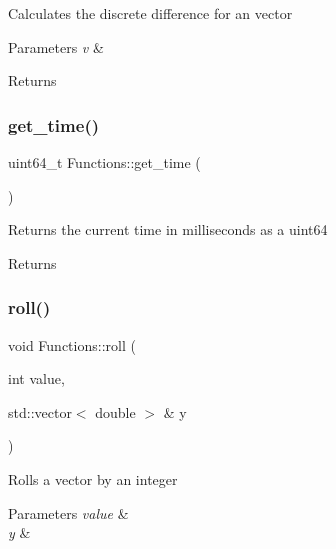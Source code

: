Calculates the discrete difference for an vector


\begin{DoxyParams}{Parameters}
{\em v} & \\
\hline
\end{DoxyParams}
\begin{DoxyReturn}{Returns}

\end{DoxyReturn}
\mbox{\label{namespace_functions_a0f3325eb8b88e73ff76e558290d3b346}} 
\subsubsection{\texorpdfstring{get\+\_\+time()}{get\_time()}}
{\footnotesize\ttfamily uint64\+\_\+t Functions\+::get\+\_\+time (\begin{DoxyParamCaption}{ }\end{DoxyParamCaption})}

Returns the current time in milliseconds as a uint64 \begin{DoxyReturn}{Returns}

\end{DoxyReturn}
\mbox{\label{namespace_functions_a3f9558335e568ef96875e356712737d5}} 
\subsubsection{\texorpdfstring{roll()}{roll()}}
{\footnotesize\ttfamily void Functions\+::roll (\begin{DoxyParamCaption}\item[{int}]{value,  }\item[{std\+::vector$<$ double $>$ \&}]{y }\end{DoxyParamCaption})}

Rolls a vector by an integer


\begin{DoxyParams}{Parameters}
{\em value} & \\
\hline
{\em y} & \\
\hline
\end{DoxyParams}
\mbox{\label{namespace_functions_a9327d93975ced0eda3d86e7cc0eaa2ce}} 
